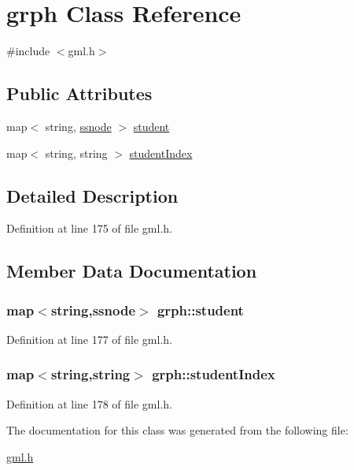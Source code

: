 \hypertarget{classgrph}{\section{grph \-Class \-Reference}
\label{classgrph}
}


{\ttfamily \#include $<$gml.\-h$>$}

\subsection*{\-Public \-Attributes}
\begin{DoxyCompactItemize}
\item 
map$<$ string, \hyperlink{structssnode}{ssnode} $>$ \hyperlink{classgrph_ab9192b1bbc169f430bbc65663f1ed29a}{student}
\item 
map$<$ string, string $>$ \hyperlink{classgrph_ab5764e01fbd99ef2945cd2be1f8cb31e}{student\-Index}
\end{DoxyCompactItemize}


\subsection{\-Detailed \-Description}


\-Definition at line 175 of file gml.\-h.



\subsection{\-Member \-Data \-Documentation}
\hypertarget{classgrph_ab9192b1bbc169f430bbc65663f1ed29a}{
\subsubsection[{student}]{\setlength{\rightskip}{0pt plus 5cm}map$<$string,{\bf ssnode}$>$ {\bf grph\-::student}}}\label{classgrph_ab9192b1bbc169f430bbc65663f1ed29a}


\-Definition at line 177 of file gml.\-h.

\hypertarget{classgrph_ab5764e01fbd99ef2945cd2be1f8cb31e}{
\subsubsection[{student\-Index}]{\setlength{\rightskip}{0pt plus 5cm}map$<$string,string$>$ {\bf grph\-::student\-Index}}}\label{classgrph_ab5764e01fbd99ef2945cd2be1f8cb31e}


\-Definition at line 178 of file gml.\-h.



\-The documentation for this class was generated from the following file\-:\begin{DoxyCompactItemize}
\item 
\hyperlink{gml_8h}{gml.\-h}\end{DoxyCompactItemize}

